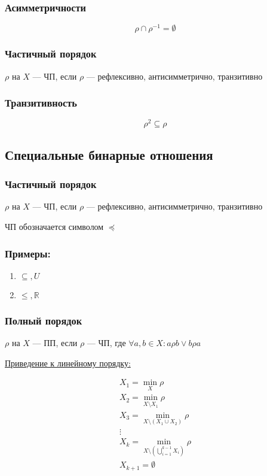 \documentclass{article}
\begin{document}
\subsubsection{Асимметричности}
\[ \rho \cap \rho^{-1} = \emptyset \]
\subsubsection{Частичный порядок}

$\rho$ на $X$ --- ЧП, если $\rho$ --- рефлексивно, антисимметрично, транзитивно


\subsubsection{Транзитивность}
\[ \rho^2 \subseteq \rho \]

\subsection{Специальные бинарные отношения}

\subsubsection{Частичный порядок}

$\rho$ на $X$ --- ЧП, если $\rho$ --- рефлексивно, антисимметрично, транзитивно

ЧП обозначается символом $\preceq$

\subsubsection*{Примеры:}

\begin{enumerate}
	\item $\subseteq, U$
	\item $\le, \mathbb{R}$
\end{enumerate}

\subsubsection{Полный порядок}

$\rho$ на $X$ --- ПП, если $\rho$ --- ЧП, где
$\forall a, b \in X : a \rho b \lor b \rho a$

\pagebreak
\underline{Приведение к линейному порядку:}

\begin{gather*}
	X_1 = \min \limits_{X} \rho \\
	X_2 = \min \limits_{X \setminus X_1} \rho \\
	X_3 = \min \limits_{X \setminus (X_1 \cup X_2)} \rho \\
	\vdots \\
	X_k = \min \limits_{X \setminus (\bigcup \limits_{i=1}^{k-1} X_i)} \rho \\
	X_{k+1} = \emptyset
\end{gather*}
\end{document}
